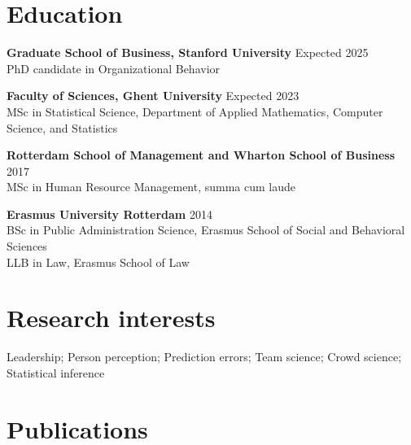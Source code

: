 \documentclass[11pt,a4paper,]{awesome-cv}
\begin{document}
\makecvheader






\hypertarget{education}{%
\section{Education}\label{education}}

\textbf{Graduate School of Business, Stanford University}
\hfill Expected 2025\\
PhD candidate in Organizational Behavior

\textbf{Faculty of Sciences, Ghent University} \hfill Expected 2023\\
MSc in Statistical Science, Department of Applied Mathematics, Computer
Science, and Statistics

\textbf{Rotterdam School of Management and Wharton School of Business}
\hfill 2017\\
MSc in Human Resource Management, summa cum laude

\textbf{Erasmus University Rotterdam} \hfill 2014\\
BSc in Public Administration Science, Erasmus School of Social and
Behavioral Sciences\\
LLB in Law, Erasmus School of Law

\hypertarget{research-interests}{%
\section{Research interests}\label{research-interests}}

Leadership; Person perception; Prediction errors; Team science; Crowd
science; Statistical inference

\hypertarget{publications}{%
\section{Publications}\label{publications}}
\end{document}
